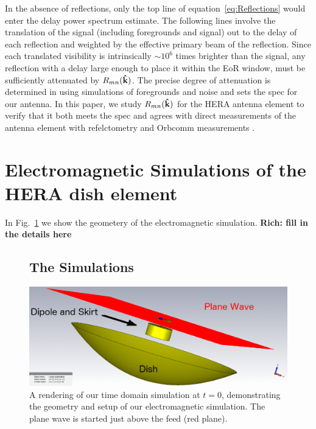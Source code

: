 \documentclass[twocolumn]{emulateapj}
\begin{document}
In the absence of reflections, only the top line of equation~\ref{eq:Reflections} would enter the delay power spectrum estimate. The following lines involve the translation of the signal (including foregrounds and signal) out to the delay of each reflection and weighted by the effective primary beam of the reflection. Since each translated visibility is intrinsically $\sim 10^6$ times brighter than the signal, any reflection with a delay large enough to place it within the EoR window, must be sufficiently attenuated by $R_{mn}({\bf \hat{k}})$. The precise degree of attenuation is determined in \citep{Thyagarajan:2015c} using simulations of foregrounds and noise and sets the spec for our antenna. In this paper, we study $R_{mn}({\bf \hat{k}})$ for the HERA antenna element to verify that it both meets the spec and agrees with direct measurements of the antenna element with refelctometry \citep{Patra:2015} and Orbcomm measurements \citep{Neben:2015b}.

\section{Electromagnetic Simulations of the HERA dish element}\label{sec:Simulations}
In Fig.~\ref{fig:SimulationSetup} we show the geometery of the electromagnetic simulation. {\bf Rich: fill in the details here}
\begin{figure}


\subsection{The Simulations}
\includegraphics[width=.5\textwidth]{figures/One_dish_Pfeed_render_pw_0deg.png}
\caption{A rendering of our time domain simulation at $t=0$, demonstrating the geometry and setup of our electromagnetic simulation. The plane wave is started just above the feed (red plane).}\label{fig:SimulationSetup}
\end{figure}
\end{document}
